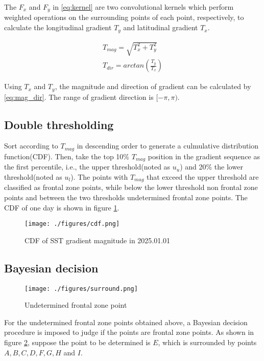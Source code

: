 The $F_x$ and $F_y$ in \eqref{eq:kernel} are two convolutional kernels which perform weighted operations on the surrounding points of each point, respectively, to calculate the longitudinal gradient $T_y$ and latitudinal gradient $T_x$.

\begin{equation}\label{eq:mag_dir}
	\begin{gathered}
		T_{mag}=\sqrt{T_x^2+T_y^2}\\
		T_{dir}=arctan(\frac{T_y}{T_x})
	\end{gathered}
\end{equation}

Using $T_x$ and $T_y$, the magnitude and direction of gradient can be calculated by \eqref{eq:mag_dir}. The range of gradient direction is $[-\pi, \pi)$.

\subsection{Double thresholding}
Sort according to $T_{mag}$ in descending order to generate a culmulative distribution function(CDF). Then, take the top 10\% $T_{mag}$ position in the gradient sequence as the first percentile, i.e., the upper threshold(noted as $u_u$) and 20\% the lower threshold(noted as $u_l$). The points with $T_{mag}$ that exceed the upper threshold are classified as frontal zone points, while below the lower threshold non frontal zone points and between the two thresholds undetermined frontal zone points. The CDF of one day is shown in figure \ref{fig:cdf}.

\begin{figure}[!t]
	\centering
	\texttt{[image: ./figures/cdf.png]}
	\caption{CDF of SST gradient magnitude in 2025.01.01} 
	\label{fig:cdf} 
\end{figure}

\subsection{Bayesian decision}
\begin{figure}
	\centering
	\texttt{[image: ./figures/surround.png]}
	\caption{Undetermined frontal zone point} 
	\label{fig:surround} 
\end{figure}

For the undetermined frontal zone points obtained above, a Bayesian decision procedure is imposed to judge if the points are frontal zone points. As shown in figure \ref{fig:surround}, suppose the point to be determined is $E$, which is surrounded by points $A, B, C, D, F, G, H$ and $I$.

